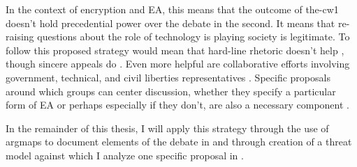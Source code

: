 In the context of \ac{encryption} and \ac{EA}, this means that the outcome of \ac{the-cw1} doesn't hold precedential
power over the debate in the second. It means that re-raising questions about the role of technology is playing society
is legitimate. To follow this proposed strategy would mean that hard-line rhetoric doesn't help \cite{ruiz_there_2018}
\cite{geller_2019}, though sincere appeals do \cite{abelson_2015} \cite{intl_2020} \cite{rozenshtein_2019}. Even more
helpful are collaborative efforts involving government, technical, and civil liberties representatives
\cite{committee_decrypting_2018} \cite{group_2019}. Specific proposals around which groups can center discussion,
whether they specify a particular form of \ac{EA} or perhaps especially if they don't, are also a necessary component
\cite{kerr_encryption_2017} \cite{wright_crypto_2018} \cite{phan_key_2017}.

In the remainder of this thesis, I will apply this strategy through the use of \acp{argmap} to document elements of the
debate in  and through creation of a threat model against which I analyze one specific proposal
in .
